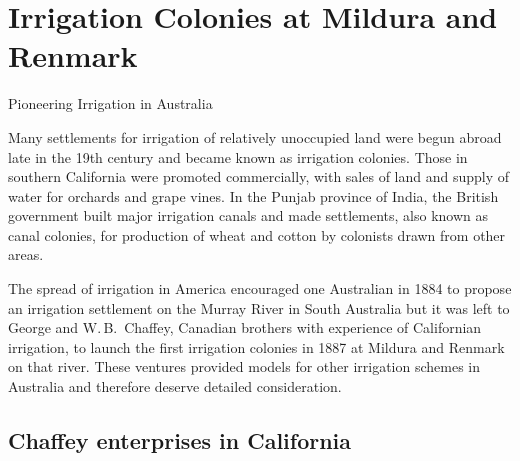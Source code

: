 
\setcounter{endnote}{0}

\chapter{Irrigation Colonies at Mildura and Renmark}
\label{ch:colonies}
%
{Pioneering Irrigation in Australia}

Many settlements for irrigation of relatively unoccupied land were
begun abroad late in the 19th century and became known as irrigation
colonies.  Those in southern California were promoted commercially,
with sales of land and supply of water for orchards and grape vines.
In the Punjab province of India, the British government built major
irrigation canals and made settlements, also known as canal colonies,
for production of wheat and cotton by colonists drawn from other
areas.

The spread of irrigation in America encouraged one Australian in 1884
to propose an irrigation settlement on the Murray River in South
Australia but it was left to George and W.\,B.~Chaffey, Canadian
brothers with experience of Californian irrigation, to launch the
first irrigation colonies in 1887 at Mildura and Renmark on that
river.  These ventures provided models for other irrigation schemes in
Australia and therefore deserve detailed consideration.

\section*{Chaffey enterprises in California}

